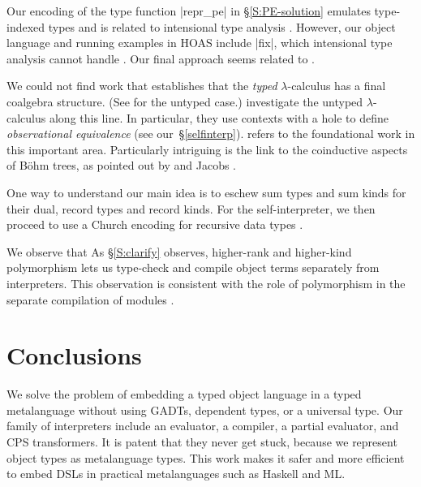 Our encoding of the type function |repr_pe| in \S\ref{S:PE-solution}
emulates type-indexed types and is related to intensional type analysis
\citep{Morrisett-intensional,Generic-Haskell}. However, our object
language and running examples in HOAS include |fix|,
which intensional type analysis cannot handle
\citep{xi-guarded}.  Our final approach
seems related to \citet{Washburn-Weirich-boxes}.


We could not find work that establishes that
the \emph{typed} $\lambda$-calculus has a final coalgebra structure.
\ifshort
(See  for the untyped case.)
\else
{}
investigate the untyped $\lambda$-calculus
along this line.  
In particular, they use
contexts with a hole \citep[p.\,13]{honsell99coinductive} to define
\emph{observational equivalence}
(see our~\S\ref{selfinterp}).
 refers to the
foundational work in this important area.  
Particularly intriguing is the link to the
coinductive aspects of B\"{o}hm trees, as pointed out by
\citet{berarducci-models} and Jacobs \citeyearpar[Example 4.3.4]{jacobs-coalgebra}.
\fi

\ifshort\else
One way to understand our main idea is to eschew sum types and sum kinds
for their dual, record types and record kinds.
For the self\hyp interpreter, we then proceed to use a Church encoding for
recursive data types \citep{bohm-automatic}.
\fi

\ifshort We observe that \else As \S\ref{S:clarify} observes, \fi
higher-rank and higher-kind
polymorphism lets us type-check and compile object terms separately from
interpreters.  This \ifshort\else observation \fi is consistent with the role of
polymorphism in the separate compilation of modules
\citep{shao-typed}.

\section{Conclusions}\label{conclusion}

We solve the problem of embedding a typed object language in a typed
metalanguage without using GADTs, dependent types, or a universal type.
Our family of interpreters include an evaluator, a compiler, a partial
evaluator, and CPS transformers.  It is patent that they never get stuck,
because we represent object types as metalanguage types.  This work
makes it safer and more efficient to embed DSLs
in practical metalanguages such as Haskell and ML\@.

